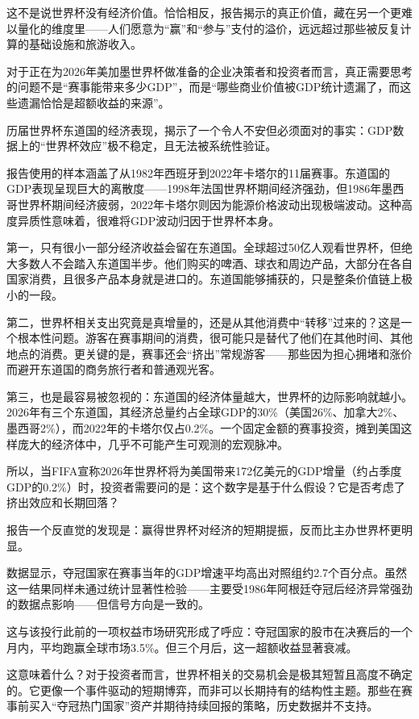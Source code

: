 \documentclass[11pt]{ctexart}
\begin{document}
这不是说世界杯没有经济价值。恰恰相反，报告揭示的真正价值，藏在另一个更难以量化的维度里——人们愿意为“赢”和“参与”支付的溢价，远远超过那些被反复计算的基础设施和旅游收入。

对于正在为2026年美加墨世界杯做准备的企业决策者和投资者而言，真正需要思考的问题不是“赛事能带来多少GDP”，而是“哪些商业价值被GDP统计遗漏了，而这些遗漏恰恰是超额收益的来源”。

历届世界杯东道国的经济表现，揭示了一个令人不安但必须面对的事实：GDP数据上的“世界杯效应”极不稳定，且无法被系统性验证。

报告使用的样本涵盖了从1982年西班牙到2022年卡塔尔的11届赛事。东道国的GDP表现呈现巨大的离散度——1998年法国世界杯期间经济强劲，但1986年墨西哥世界杯期间经济疲弱，2022年卡塔尔则因为能源价格波动出现极端波动。这种高度异质性意味着，很难将GDP波动归因于世界杯本身。

第一，只有很小一部分经济收益会留在东道国。全球超过50亿人观看世界杯，但绝大多数人不会踏入东道国半步。他们购买的啤酒、球衣和周边产品，大部分在各自国家消费，且很多产品本身就是进口的。东道国能够捕获的，只是整条价值链上极小的一段。

第二，世界杯相关支出究竟是真增量的，还是从其他消费中“转移”过来的？这是一个根本性问题。游客在赛事期间的消费，很可能只是替代了他们在其他时间、其他地点的消费。更关键的是，赛事还会“挤出”常规游客——那些因为担心拥堵和涨价而避开东道国的商务旅行者和普通观光客。

第三，也是最容易被忽视的：东道国的经济体量越大，世界杯的边际影响就越小。2026年有三个东道国，其经济总量约占全球GDP的30\%（美国26\%、加拿大2\%、墨西哥2\%），而2022年的卡塔尔仅占0.2\%。一个固定金额的赛事投资，摊到美国这样庞大的经济体中，几乎不可能产生可观测的宏观脉冲。

所以，当FIFA宣称2026年世界杯将为美国带来172亿美元的GDP增量（约占季度GDP的0.2\%）时，投资者需要问的是：这个数字是基于什么假设？它是否考虑了挤出效应和长期回落？

报告一个反直觉的发现是：赢得世界杯对经济的短期提振，反而比主办世界杯更明显。

数据显示，夺冠国家在赛事当年的GDP增速平均高出对照组约2.7个百分点。虽然这一结果同样未通过统计显著性检验——主要受1986年阿根廷夺冠后经济异常强劲的数据点影响——但信号方向是一致的。

这与该投行此前的一项权益市场研究形成了呼应：夺冠国家的股市在决赛后的一个月内，平均跑赢全球市场3.5\%。但三个月后，这一超额收益显著衰减。

这意味着什么？对于投资者而言，世界杯相关的交易机会是极其短暂且高度不确定的。它更像一个事件驱动的短期博弈，而非可以长期持有的结构性主题。那些在赛事前买入“夺冠热门国家”资产并期待持续回报的策略，历史数据并不支持。
\end{document}
